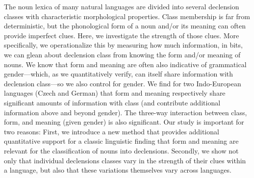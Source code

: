 The noun lexica of many natural languages are divided into several declension classes with characteristic morphological properties. Class membership is far from deterministic, but the phonological form of a noun and/or its meaning can often provide imperfect clues. Here, we investigate the strength of those clues. More specifically, we operationalize this by measuring how much information, in bits, we can glean about declension class from knowing the form and/or meaning of nouns. We know that form and meaning are often also indicative of grammatical gender—which, as we  quantitatively verify, can itself share information with declension class—so we also control for gender. We find for two Indo-European languages (Czech and German) that form and meaning respectively share significant amounts of information with class (and contribute additional information above and beyond gender). The three-way interaction between class, form, and meaning (given gender) is also significant. Our study is important for two reasons: First, we introduce a new method that provides  additional quantitative support for a classic linguistic finding that form and meaning are relevant for the classification of nouns into declensions. Secondly, we show not only that individual declensions classes vary in the strength of their clues within a language, but also that these variations themselves vary across languages.
